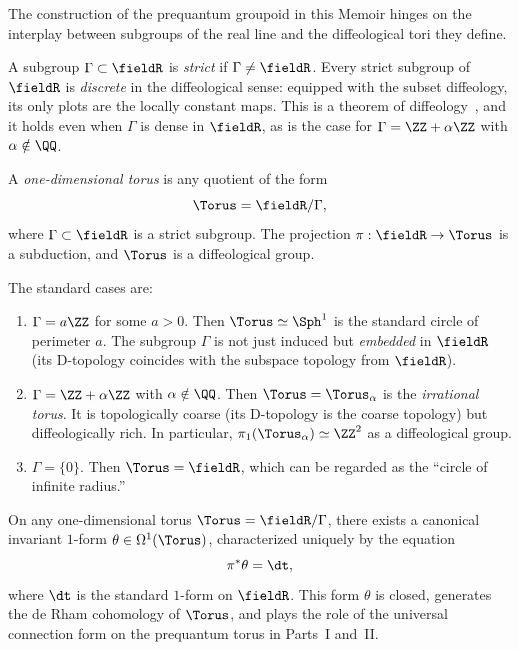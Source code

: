 \begin{article}
  \label{art:One-Dimensional Tori}
  The construction of the prequantum groupoid in this Memoir hinges on the
  interplay between subgroups of the real line and the diffeological tori
  they define.
  
  A subgroup $\Gamma \subset \fieldR$ is \emph{strict} if $\Gamma \neq \fieldR$.
  Every strict subgroup of $\fieldR$ is \emph{discrete} in the diffeological sense:
  equipped with the subset diffeology,
  its only plots are the locally constant maps.
  This is a theorem of diffeology~\cite{PIZ13},
  and it holds even when $\Gamma$ is dense in $\fieldR$,
  as is the case for $\Gamma = \ZZ + \alpha\ZZ$ with $\alpha \notin \QQ$.
  
  \begin{definition}
    A \emph{one-dimensional torus} is any quotient of the form
    \[
      \Torus = \fieldR/\Gamma,
      \]
    where $\Gamma \subset \fieldR$ is a strict subgroup.
    The projection $\pi: \fieldR \to \Torus$ is a subduction,
    and $\Torus$ is a diffeological group.
  \end{definition}
  
  The standard cases are:
  \begin{enumerate}
    \item $\Gamma = a\ZZ$ for some $a > 0$.
    Then $\Torus \simeq \Sph^1$ is the standard circle of perimeter $a$.
    The subgroup $\Gamma$ is not just induced but \emph{embedded} in $\fieldR$
    (its D-topology coincides with the subspace topology from $\fieldR$).
    \item $\Gamma = \ZZ + \alpha\ZZ$ with $\alpha \notin \QQ$.
    Then $\Torus = \Torus_\alpha$ is the \emph{irrational torus}.
    It is topologically coarse (its D-topology is the coarse topology)
    but diffeologically rich.
    In particular,
    $\pi_1(\Torus_\alpha) \simeq \ZZ^2$ as a diffeological group.
    \item $\Gamma = \{0\}$.
    Then $\Torus = \fieldR$,
    which can be regarded as the ``circle of infinite radius.''
  \end{enumerate}
  
  On any one-dimensional torus $\Torus = \fieldR/\Gamma$,
  there exists a canonical invariant $1$-form $\theta \in \Omega^1(\Torus)$,
  characterized uniquely by the equation
  \[
    \pi^*\theta = \dt,
    \]
  where $\dt$ is the standard $1$-form on $\fieldR$.
  This form $\theta$ is closed,
  generates the de Rham cohomology of $\Torus$,
  and plays the role of the universal connection form
  on the prequantum torus in Parts~I and~II.
\end{article}

